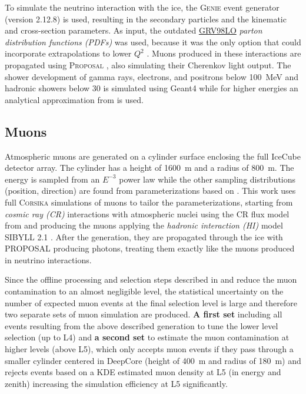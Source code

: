 To simulate the neutrino interaction with the ice, the \textsc{Genie} event generator  (version 2.12.8) is used, resulting in the secondary particles and the kinematic and cross-section parameters. As input, the outdated \href{https://internal.dunescience.org/doxygen/classgenie_1_1GRV89LO.html}{GRV98LO}  \textit{parton distribution functions (PDFs)} was used, because it was the only option that could incorporate extrapolations to lower $Q^2$ . Muons produced in these interactions are propagated using \textsc{Proposal} , also simulating their Cherenkov light output. The shower development of gamma rays, electrons, and positrons below \SI{100}{\mega\electronvolt} and hadronic showers below \SI{30}{\gev} is simulated using Geant4  while for higher energies an analytical approximation from  is used.


\subsection{Muons}

Atmospheric muons are generated on a cylinder surface enclosing the full IceCube detector array. The cylinder has a height of \SI{1600}{\meter} and a radius of \SI{800}{\meter}. The energy is sampled from an $E^{-3}$ power law while the other sampling distributions (position, direction) are found from parameterizations based on . This work uses full \textsc{Corsika}  simulations of muons to tailor the parameterizations, starting from \textit{cosmic ray (CR)} interactions with atmospheric nuclei using the CR flux model from  and producing the muons applying the \textit{hadronic interaction (HI)} model SIBYLL 2.1 . After the generation, they are propagated through the ice with PROPOSAL producing photons, treating them exactly like the muons produced in neutrino interactions.

Since the offline processing and selection steps described in  and  reduce the muon contamination to an almost negligible level, the statistical uncertainty on the number of expected muon events at the final selection level is large and therefore two separate sets of muon simulation are produced. \textbf{A first set} including all events resulting from the above described generation to tune the lower level selection (up to L4) and \textbf{a second set} to estimate the muon contamination at higher levels (above L5), which only accepts muon events if they pass through a smaller cylinder centered in DeepCore (height of \SI{400}{\meter} and radius of \SI{180}{\meter}) and rejects events based on a KDE estimated muon density at L5 (in energy and zenith) increasing the simulation efficiency at L5 significantly.

